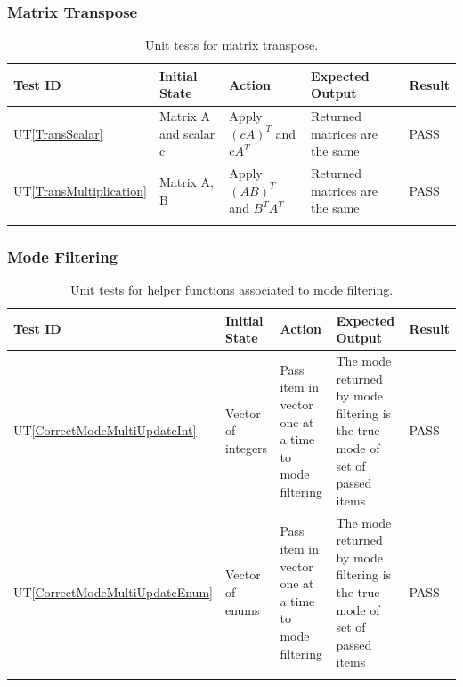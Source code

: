 \documentclass[12pt, titlepage]{article}
\newcommand{\utref}[1]{UT\ref{#1}}
\begin{document}
\subsubsection{Matrix Transpose}
{\footnotesize
\begin{longtable}{|p{0.8cm}|p{3.5cm}|p{3.5cm}|p{3.5cm}|p{1cm}|}
    \hline
    \textbf{Test ID} & \textbf{Initial State} & \textbf{Action} &
    \textbf{Expected Output} & \textbf{Result} \\ 
    \endfirsthead
    \hline
    
    \utref{TransScalar} & Matrix A and scalar c & Apply $(cA)^T$ and c$A^T$ &
    Returned matrices are the same & PASS\\ \hline
    \utref{TransMultiplication} & Matrix A, B & Apply $(AB)^T$ and $B^TA^T$ &
    Returned matrices are the same & PASS\\ \hline

    \caption{Unit tests for matrix transpose.}
    \label{tab:unit_test_matrix_trans}
\end{longtable}
}

\subsubsection{Mode Filtering}
{\footnotesize
\begin{longtable}{|p{0.8cm}|p{3.5cm}|p{3.5cm}|p{3.5cm}|p{1cm}|}
    \hline
    \textbf{Test ID} & \textbf{Initial State} & \textbf{Action} &
    \textbf{Expected Output} & \textbf{Result} \\ 
    \endfirsthead
    \hline
    
    \utref{CorrectModeMultiUpdateInt} & Vector of integers & Pass item in vector
    one at a time to mode filtering & The mode returned by mode filtering is the
    true mode of set of passed items & PASS\\ \hline
    \utref{CorrectModeMultiUpdateEnum} & Vector of enums & Pass item in vector
    one at a time to mode filtering & The mode returned by mode filtering is the
    true mode of set of passed items & PASS\\ \hline

    \caption{Unit tests for helper functions associated to mode filtering.}
    \label{tab:unit_test_mode_filter}
\end{longtable}
}
\end{document}
